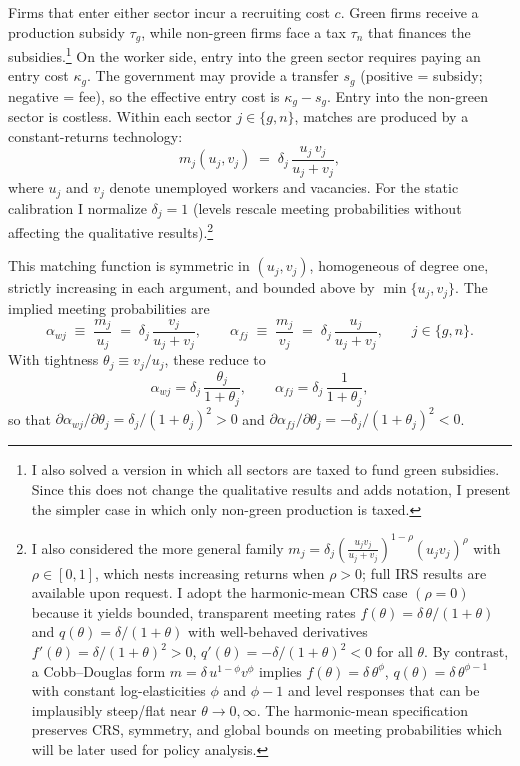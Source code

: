 \documentclass[preprint,12pt]{elsarticle}
\begin{document}
Firms that enter either sector incur a recruiting cost $c$. Green firms receive a production subsidy $\tau_g$, while non-green firms face a tax $\tau_n$ that finances the subsidies.\footnote{I also solved a version in which all sectors are taxed to fund green subsidies. Since this does not change the qualitative results and adds notation, I present the simpler case in which only non-green production is taxed.} On the worker side, entry into the green sector requires paying an entry cost $\kappa_g$. The government may provide a transfer $s_g$ (positive = subsidy; negative = fee), so the effective entry cost is $\kappa_g - s_g$. Entry into the non-green sector is costless.
Within each sector \(j\in\{g,n\}\), matches are produced by a constant-returns technology:
\[
m_j(u_j,v_j)\;=\;\delta_j\,\frac{u_j\,v_j}{u_j+v_j},
\]
where \(u_j\) and \(v_j\) denote unemployed workers and vacancies. For the static calibration I normalize \(\delta_j=1\) (levels rescale meeting probabilities without affecting the qualitative results).\footnote{I also considered the more general family \(m_j=\delta_j\!\left(\tfrac{u_j v_j}{u_j+v_j}\right)^{1-\rho}(u_j v_j)^{\rho}\) with \(\rho\in[0,1]\), which nests increasing returns when \(\rho>0\); full IRS results are available upon request. I adopt the harmonic-mean CRS case \((\rho=0)\) because it yields bounded, transparent meeting rates \(f(\theta)=\delta\,\theta/(1+\theta)\) and \(q(\theta)=\delta/(1+\theta)\) with well-behaved derivatives \(f'(\theta)=\delta/(1+\theta)^2>0\), \(q'(\theta)=-\delta/(1+\theta)^2<0\) for all \(\theta\). By contrast, a Cobb–Douglas form \(m=\delta\,u^{1-\phi}v^{\phi}\) implies \(f(\theta)=\delta\,\theta^{\phi}\), \(q(\theta)=\delta\,\theta^{\phi-1}\) with constant log-elasticities \(\phi\) and \(\phi-1\) and level responses that can be implausibly steep/flat near \(\theta\to0,\infty\). The harmonic-mean specification preserves CRS, symmetry, and global bounds on meeting probabilities which will be later used for policy analysis.}

This matching function is symmetric in \((u_j,v_j)\), homogeneous of degree one, strictly increasing in each argument, and bounded above by \(\min\{u_j,v_j\}\). The implied meeting probabilities are
\begin{equation}
\alpha_{wj}\;\equiv\;\frac{m_j}{u_j}\;=\;\delta_j\,\frac{v_j}{u_j+v_j},\qquad
\alpha_{fj}\;\equiv\;\frac{m_j}{v_j}\;=\;\delta_j\,\frac{u_j}{u_j+v_j},\qquad j\in\{g,n\}.
\label{matching_probs}
\end{equation}
With tightness \(\theta_j\equiv v_j/u_j\), these reduce to
\[
\alpha_{wj} = \delta_j\,\frac{\theta_j}{1+\theta_j},\qquad \alpha_{fj} = \delta_j\,\frac{1}{1+\theta_j},
\]
so that \(\partial\alpha_{wj}/\partial\theta_j = \delta_j/(1+\theta_j)^2>0\) and \(\partial\alpha_{fj}/\partial\theta_j = -\delta_j/(1+\theta_j)^2<0\).
\end{document}
